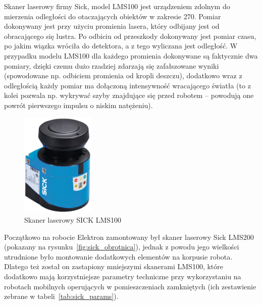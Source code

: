Skaner laserowy firmy Sick, model LMS100 jest urządzeniem zdolnym do mierzenia
odległości do otaczających obiektów w zakresie 270\textdegree. Pomiar dokonywany
jest przy użyciu promienia lasera, który odbijany jest od obracającego się
lustra. Po odbiciu od przeszkody dokonywany jest pomiar czasu, po jakim wiązka
wróciła do detektora, a z tego wyliczana jest odległość. W przypadku modelu
LMS100 dla każdego promienia dokonywane są faktycznie dwa pomiary, dzięki czemu
dużo rzadziej zdarzają się zafałszowane wyniki (spowodowane np. odbiciem
promienia od kropli deszczu), dodatkowo wraz z odległością każdy pomiar ma
dołączoną intensywność wracającego światła (to z kolei pozwala np. wykrywać
szyby znajdujące się przed robotem -- powodują one powrót pierwszego impulsu o
niskim natężeniu).

\begin{figure}[h!]
\centering
\includegraphics[height=5cm]{../img/LMS100}
\caption{Skaner laserowy SICK LMS100}
\label{fig:sick}
\end{figure}

Początkowo na robocie Elektron zamontowany był skaner laserowy Sick LMS200
(pokazany na rysunku~\ref{fig:sick_obrotnica}), jednak z powodu jego wielkości
utrudnione było montowanie dodatkowych elementów na korpusie robota. Dlatego też
został on zastapiony mniejszymi skanerami LMS100, które dodatkowo mają
korzystniejsze parametry techniczne przy wykorzystaniu na robotach mobilnych
operujących w pomieszczeniach zamkniętych (ich zestawienie zebrane w
tabeli~\ref{tab:sick_params}).

